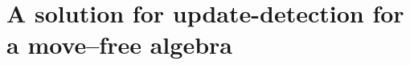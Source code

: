 \section{A solution for update-detection for a move--free algebra}
\label{app:update-move}

\begin{comment}
\subsection{A simple way}
\remark{Do we need this in the paper?}
A ``simple way'' means that when determining the commands which lead from
the
original to the present state of the filesystems we do not use commands
like moving a whole subtree or removing a subtree. Commands only allowed
at leaves of the tree of the filesystem, e.g. files or directories
containing no files.

Consider the original state, called \(O\) and the present state called
\(A\). In order to be able to determine the \emph{move} operations, we'd
like to compare the containings of two files in the original and in the
present state. It doesn't mean that we have to store the original
filesystem. This can be achieved by a method called
\emph{data--fingerprint} with which we can compare contents of files
without comparing the whole amount of data stored in them. 

A function called \(origin(\pi)\) gives
us a path for a file in the filesystem \(O\) which has the same contents 
as the file \(A\cdot\pi\), or empty--file (\(\perp\)) if such a file does
not exist. Note that more files may be found in \(O\) with the same
contents.

Another function, \(\#(\pi)\) gives the number of paths \(\varphi\) for
which \(origin(\varphi)=\pi\) holds.

Then to gain a possible sequence of commands, compare \(O\cdot\pi\) and
\(A\cdot\pi\). (For this purpose, we can use timestamps, inode numbers,
or any other data on files provided by the operation system.) 
If they're the same, we
don't need to do anything. If not, we have three cases. First, if the
file \(A\cdot\pi\) has been deleted, we can delete this file iff
\(\#(\pi)=0\). If the file exists in \(A\) it may have an origin or not.
If it has, and \(\#(\pi)=0\), than we can \emph{move} \(origin(\pi)\) to
\(\pi\) iff \(\#(origin(\pi))=1\), or \emph{copy} it if
\(\#(origin(\pi))>1\). In both cases, we should decrease
\(\#(origin(\pi))\) by one.

If we couldn't do anything because \(\#(\pi)\) was greater than \(0\), we
can do one of the followings: wait till it decreases due to another
commands, or, if there's a \emph{loop} of file displacings (for example
\(origin(a)=b\) and \(origin(b)=a\)) than we should rename the origin of
one of the files in order to be able to continue (solving the
example: \emph{move} \(b\to b^\prime\), \(a\to b\) and \(b^\prime\to
a\)).

That way we gained a possible sequence of commands which if we apply
to 
filesystem \(O\) we'll get filesystem \(A\).
\end{comment}

